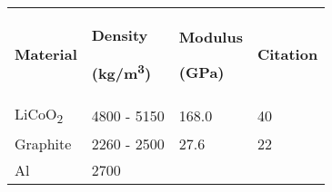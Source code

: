 \documentclass[]{article}
\begin{document}
\begin{longtable}[c]{@{}llll@{}}
\toprule
\begin{minipage}[t]{0.22\columnwidth}\raggedright\strut
\textbf{Material}
\strut\end{minipage} &
\begin{minipage}[t]{0.22\columnwidth}\raggedright\strut
\textbf{Density}

\textbf{(kg/m}{\textbf{\textsuperscript{3}}}\textbf{)}
\strut\end{minipage} &
\begin{minipage}[t]{0.22\columnwidth}\raggedright\strut
\textbf{Modulus}

\textbf{(GPa)}
\strut\end{minipage} &
\begin{minipage}[t]{0.22\columnwidth}\raggedright\strut
\textbf{Citation}
\strut\end{minipage}\tabularnewline
\begin{minipage}[t]{0.22\columnwidth}\raggedright\strut
LiCoO{\textsubscript{2}}
\strut\end{minipage} &
\begin{minipage}[t]{0.22\columnwidth}\raggedright\strut
4800 - 5150
\strut\end{minipage} &
\begin{minipage}[t]{0.22\columnwidth}\raggedright\strut
168.0
\strut\end{minipage} &
\begin{minipage}[t]{0.22\columnwidth}\raggedright\strut
40
\strut\end{minipage}\tabularnewline
\begin{minipage}[t]{0.22\columnwidth}\raggedright\strut
Graphite
\strut\end{minipage} &
\begin{minipage}[t]{0.22\columnwidth}\raggedright\strut
2260 - 2500
\strut\end{minipage} &
\begin{minipage}[t]{0.22\columnwidth}\raggedright\strut
27.6
\strut\end{minipage} &
\begin{minipage}[t]{0.22\columnwidth}\raggedright\strut
22
\strut\end{minipage}\tabularnewline
\begin{minipage}[t]{0.22\columnwidth}\raggedright\strut
Al
\strut\end{minipage} &
\begin{minipage}[t]{0.22\columnwidth}\raggedright\strut
2700
\strut\end{minipage} &

\end{longtable}
\end{document}
